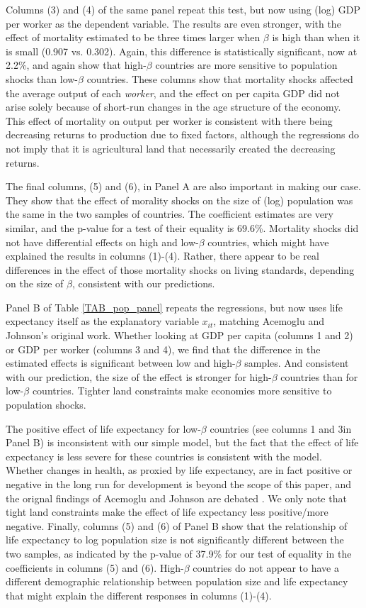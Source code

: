 \documentclass[11pt]{article}
\begin{document}
Columns (3) and (4) of the same panel repeat this test, but now using (log) GDP per worker as the dependent variable. The results are even stronger, with the effect of mortality estimated to be three times larger when $\beta$ is high than when it is small (0.907 vs. 0.302). Again, this difference is statistically significant, now at 2.2\%, and again show that high-$\beta$ countries are more sensitive to population shocks than low-$\beta$ countries. These columns show that mortality shocks affected the average output of each \textit{worker}, and the effect on per capita GDP did not arise solely because of short-run changes in the age structure of the economy. This effect of mortality on output per worker is consistent with there being decreasing returns to production due to fixed factors, although the regressions do not imply that it is agricultural land that necessarily created the decreasing returns.

The final columns, (5) and (6), in Panel A are also important in making our case. They show that the effect of morality shocks on the size of (log) population was the same in the two samples of countries. The coefficient estimates are very similar, and the p-value for a test of their equality is 69.6\%. Mortality shocks did not have differential effects on high and low-$\beta$ countries, which might have explained the results in columns (1)-(4). Rather, there appear to be real differences in the effect of those mortality shocks on living standards, depending on the size of $\beta$, consistent with our predictions.

Panel B of Table \ref{TAB_pop_panel} repeats the regressions, but now uses life expectancy itself as the explanatory variable $x_{it}$, matching Acemoglu and Johnson's original work. Whether looking at GDP per capita (columns 1 and 2) or GDP per worker (columns 3 and 4), we find that the difference in the estimated effects is significant between low and high-$\beta$ samples. And consistent with our prediction, the size of the effect is stronger for high-$\beta$ countries than for low-$\beta$ countries. Tighter land constraints make economies more sensitive to population shocks. 

The positive effect of life expectancy for low-$\beta$ countries (see columns 1 and 3in Panel B) is inconsistent with our simple model, but the fact that the effect of life expectancy is less severe for these countries is consistent with the model. Whether changes in health, as proxied by life expectancy, are in fact positive or negative in the long run for development is beyond the scope of this paper, and the orignal findings of Acemoglu and Johnson are debated \citep{bcf2014}. We only note that tight land constraints make the effect of life expectancy less positive/more negative. Finally, columns (5) and (6) of Panel B show that the relationship of life expectancy to log population size is not significantly different between the two samples, as indicated by the p-value of 37.9\% for our test of equality in the coefficients in columns (5) and (6). High-$\beta$ countries do not appear to have a different demographic relationship between population size and life expectancy that might explain the different responses in columns (1)-(4).
\end{document}
